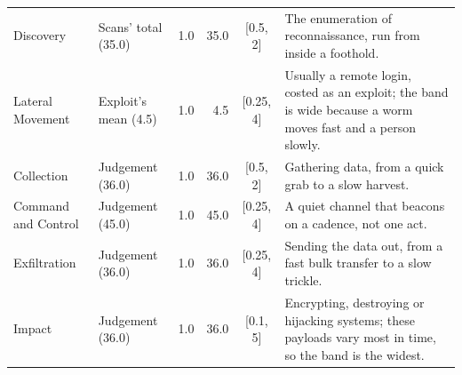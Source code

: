 \begin{table}[htbp]
\begin{tabular}{@{}P{0.15\textwidth} P{0.13\textwidth} r r c P{0.29\textwidth}@{}}
Discovery & Scans' total (35.0) & 1.0 & 35.0 & [0.5, 2] & The enumeration of reconnaissance, run from inside a foothold. \\
Lateral Movement & Exploit's mean (4.5) & 1.0 & 4.5 & [0.25, 4] & Usually a remote login, costed as an exploit; the band is wide because a worm moves fast and a person slowly. \\
Collection & Judgement (36.0) & 1.0 & 36.0 & [0.5, 2] & Gathering data, from a quick grab to a slow harvest. \\
Command and Control & Judgement (45.0) & 1.0 & 45.0 & [0.25, 4] & A quiet channel that beacons on a cadence, not one act. \\
Exfiltration & Judgement (36.0) & 1.0 & 36.0 & [0.25, 4] & Sending the data out, from a fast bulk transfer to a slow trickle. \\
Impact & Judgement (36.0) & 1.0 & 36.0 & [0.1, 5] & Encrypting, destroying or hijacking systems; these payloads vary most in time, so the band is the widest. \\
\bottomrule
\end{tabular}
\end{table}
